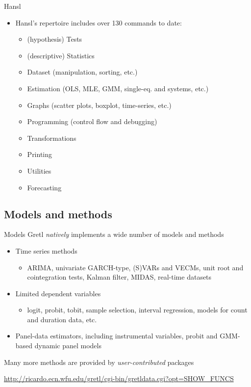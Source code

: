 \documentclass{beamer}[11pt]
\begin{document}
\begin{frame}{Hansl}
	\begin{itemize}
		\item Hansl's repertoire includes over 130 commands to date:
		\begin{itemize}
			\item (hypothesis) Tests
			\item (descriptive) Statistics
			\item Dataset (manipulation, sorting, etc.)
			\item Estimation (OLS, MLE, GMM, single-eq. and systems, etc.)
			\item Graphs (scatter plots, boxplot, time-series, etc.)
			\item Programming (control flow and debugging)
			\item Transformations
			\item Printing
			\item Utilities
			\item Forecasting
		\end{itemize}
	\end{itemize}
\end{frame}

\subsection{Models and methods}

\begin{frame}{Models}
	Gretl \textit{natively} implements a wide number of models and methods
	\begin{itemize}
		\item Time series methods
		\begin{itemize}
			\item ARIMA, univariate GARCH-type, (S)VARs and VECMs, unit root and cointegration tests, Kalman filter, MIDAS, real-time datasets
		\end{itemize}
		\item Limited dependent variables
		\begin{itemize}
			\item logit, probit, tobit, sample selection, interval regression, models for count and duration data, etc.
		\end{itemize}
		\item Panel-data estimators, including instrumental variables, probit and GMM-based dynamic panel models
	\end{itemize}
	Many more methods are provided by \textit{user-contributed} packages
	\medskip
	
	\url{http://ricardo.ecn.wfu.edu/gretl/cgi-bin/gretldata.cgi?opt=SHOW_FUNCS}
\end{frame}
\end{document}
